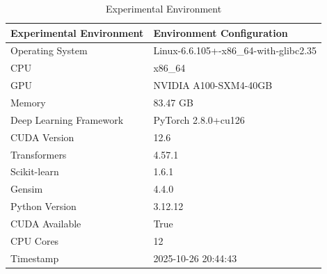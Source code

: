 \begin{table}
\caption{Experimental Environment}
\label{tab:env}
\begin{tabular}{ll}
\toprule
Experimental Environment & Environment Configuration \\
\midrule
Operating System & Linux-6.6.105+-x86_64-with-glibc2.35 \\
CPU & x86_64 \\
GPU & NVIDIA A100-SXM4-40GB \\
Memory & 83.47 GB \\
Deep Learning Framework & PyTorch 2.8.0+cu126 \\
CUDA Version & 12.6 \\
Transformers & 4.57.1 \\
Scikit-learn & 1.6.1 \\
Gensim & 4.4.0 \\
Python Version & 3.12.12 \\
CUDA Available & True \\
CPU Cores & 12 \\
Timestamp & 2025-10-26 20:44:43 \\
\bottomrule
\end{tabular}
\end{table}
